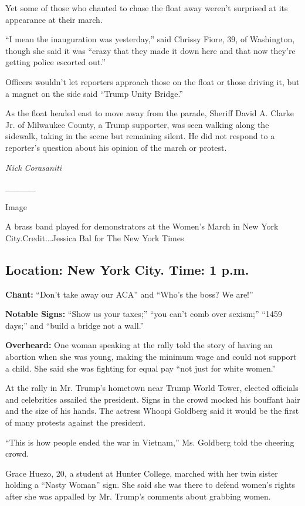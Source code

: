 Yet some of those who chanted to chase the float away weren't surprised
at its appearance at their march.

``I mean the inauguration was yesterday,'' said Chrissy Fiore, 39, of
Washington, though she said it was ``crazy that they made it down here
and that now they're getting police escorted out.''

Officers wouldn't let reporters approach those on the float or those
driving it, but a magnet on the side said ``Trump Unity Bridge.''

As the float headed east to move away from the parade, Sheriff David A.
Clarke Jr. of Milwaukee County, a Trump supporter, was seen walking
along the sidewalk, taking in the scene but remaining silent. He did not
respond to a reporter's question about his opinion of the march or
protest.

\emph{Nick Corasaniti}

\emph{\_\_\_\_\_}

Image

A brass band played for demonstrators at the Women's March in New York
City.Credit...Jessica Bal for The New York Times

\hypertarget{location-new-york-city-time-1-pm}{%
\subsection{Location: New York City. Time: 1
p.m.}\label{location-new-york-city-time-1-pm}}

\textbf{Chant:} ``Don't take away our ACA'' and ``Who's the boss? We
are!''

\textbf{Notable Signs:} ``Show us your taxes;'' ``you can't comb over
sexism;'' ``1459 days;'' and ``build a bridge not a wall.''

\textbf{Overheard:} One woman speaking at the rally told the story of
having an abortion when she was young, making the minimum wage and could
not support a child. She said she was fighting for equal pay ``not just
for white women.''

At the rally in Mr. Trump's hometown near Trump World Tower, elected
officials and celebrities assailed the president. Signs in the crowd
mocked his bouffant hair and the size of his hands. The actress Whoopi
Goldberg said it would be the first of many protests against the
president.

``This is how people ended the war in Vietnam,'' Ms. Goldberg told the
cheering crowd.

Grace Huezo, 20, a student at Hunter College, marched with her twin
sister holding a ``Nasty Woman'' sign. She said she was there to defend
women's rights after she was appalled by Mr. Trump's comments about
grabbing women.

